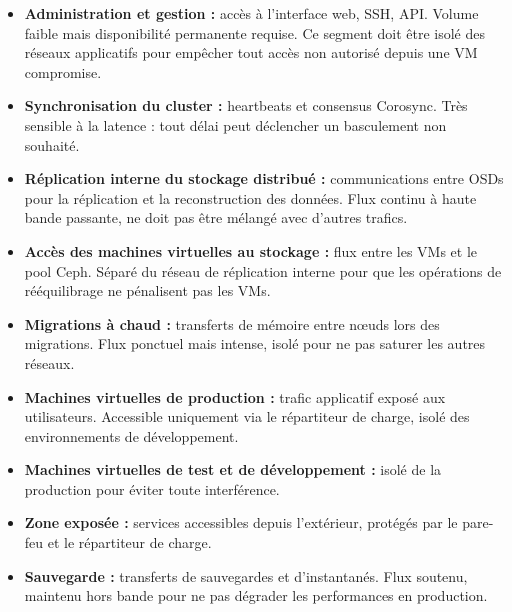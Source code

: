\begin{itemize}

    \item \textbf{Administration et gestion :} accès à l'interface web, SSH, API. Volume faible mais disponibilité permanente requise. Ce segment doit être isolé des réseaux applicatifs pour empêcher tout accès non autorisé depuis une VM compromise.

    \item \textbf{Synchronisation du cluster :} heartbeats et consensus Corosync. Très sensible à la latence : tout délai peut déclencher un basculement non souhaité.

    \item \textbf{Réplication interne du stockage distribué :} communications entre OSDs pour la réplication et la reconstruction des données. Flux continu à haute bande passante, ne doit pas être mélangé avec d'autres trafics.

    \item \textbf{Accès des machines virtuelles au stockage :} flux entre les VMs et le pool Ceph. Séparé du réseau de réplication interne pour que les opérations de rééquilibrage ne pénalisent pas les VMs.

    \item \textbf{Migrations à chaud :} transferts de mémoire entre n\oe{}uds lors des migrations. Flux ponctuel mais intense, isolé pour ne pas saturer les autres réseaux.

    \item \textbf{Machines virtuelles de production :} trafic applicatif exposé aux utilisateurs. Accessible uniquement via le répartiteur de charge, isolé des environnements de développement.

    \item \textbf{Machines virtuelles de test et de développement :} isolé de la production pour éviter toute interférence.

    \item \textbf{Zone exposée :} services accessibles depuis l'extérieur, protégés par le pare-feu et le répartiteur de charge.

    \item \textbf{Sauvegarde :} transferts de sauvegardes et d'instantanés. Flux soutenu, maintenu hors bande pour ne pas dégrader les performances en production.

\end{itemize}


